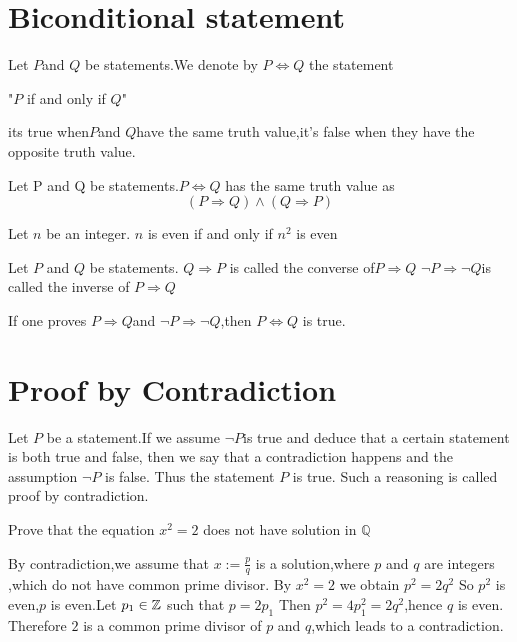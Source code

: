 \documentclass{book}
\numberwithin{equation}{section}
\begin{document}
\section{Biconditional statement}
\begin{definitionenv}
    Let $P$and $Q$ be statements.We denote by $P\Leftrightarrow Q$ the statement
    \begin{center}
        "$P$ if and only if $Q$"
    \end{center}
    its true when$P$and $Q$have the same truth value,it's false when they have the opposite truth value.
\end{definitionenv}
\begin{propositionenv}
    Let P and Q be statements.$P \Leftrightarrow Q$ has the same truth value as 
    $$(P\Rightarrow Q)\wedge (Q\Rightarrow P)$$
\end{propositionenv}
\begin{exampleenv}
    Let $n$ be an integer.
    \newline
    $n$ is even if and only if $n^2$ is even 
\end{exampleenv}
\begin{definitionenv}
    Let $P$ and $Q$ be statements.
    \newline
    $Q\Rightarrow P$ is called the converse of$P\Rightarrow Q$
    \newline
    $\neg P \Rightarrow \neg Q$is called the inverse of $P\Rightarrow Q$ 
\end{definitionenv}
\begin{remark}
    If one proves $P\Rightarrow Q$and $\neg P\Rightarrow \neg Q$,then $P \Leftrightarrow Q$ is true.
\end{remark}




\section{Proof by Contradiction}
\begin{definitionenv}
    Let $P$ be a statement.If we assume $\neg P$is true and deduce that a certain statement is both true and false, then we say that a contradiction happens and the assumption $\neg P$ is false. Thus the statement $P$ is true. Such a reasoning is called proof by contradiction.
\end{definitionenv}
\begin{exampleenv}
    Prove that the equation $x^2=2$ does not have solution in $\mathbb{Q}$
    \begin{proofenv}
        By contradiction,we assume that $x:=\frac{p}{q}$ is a solution,where $p$ and $q$ are integers ,which do not have common prime divisor.
        \newline
        By $x^2=2$ we obtain $p^2=2q^2$
        So $p^2$ is even,$p$ is even.Let $p_1\in \mathbb{Z}$ such that $p=2p_1$
        Then $p^2=4p_1^2=2q^2$,hence $q$ is even.
        \newline
        Therefore $2$ is a common prime divisor of $p$ and $q$,which leads to a contradiction.
    \end{proofenv}
\end{exampleenv}
\end{document}
